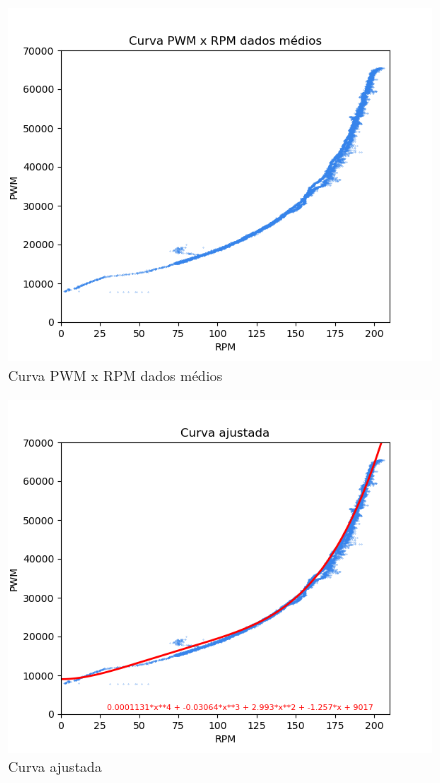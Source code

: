 \begin{figure}[htb]
	\centering
	\includegraphics{figures/curva_pwm_x_rpm_dados_medios}
	\caption{Curva PWM x RPM dados médios}
	\label{fig:medicao_pwm_x_rpm_dados_medios}
\end{figure}

\begin{figure}[htb]
	\centering
	\includegraphics{figures/curva_ajustada}
	\caption{Curva ajustada}
	\label{fig:curva_ajustada}
\end{figure}



